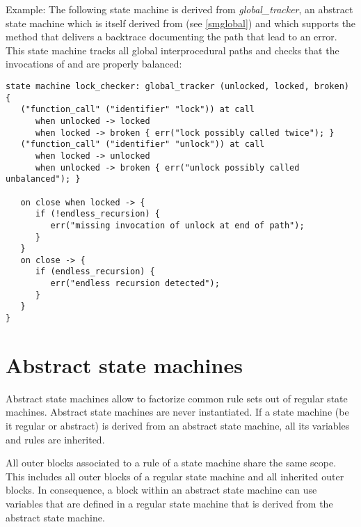 \bigskip
\noindent
Example: The following state machine is derived from \textit{global\_tracker},
an abstract state machine which is itself
derived from  (see \ref{smglobal}) and which supports
the  method that delivers a backtrace documenting the
path that lead to an error. This state machine tracks all global
interprocedural paths and checks that the invocations of 
and  are properly balanced:

\begin{lstlisting}
state machine lock_checker: global_tracker (unlocked, locked, broken) {
   ("function_call" ("identifier" "lock")) at call
      when unlocked -> locked
      when locked -> broken { err("lock possibly called twice"); }
   ("function_call" ("identifier" "unlock")) at call
      when locked -> unlocked
      when unlocked -> broken { err("unlock possibly called unbalanced"); }

   on close when locked -> {
      if (!endless_recursion) {
         err("missing invocation of unlock at end of path");
      }
   }
   on close -> {
      if (endless_recursion) {
         err("endless recursion detected");
      }
   }
}
\end{lstlisting}

\section{Abstract state machines}

Abstract state machines allow to factorize common rule sets out of
regular state machines. Abstract state machines are never instantiated.
If a state machine (be it regular or abstract) is derived from an
abstract state machine, all its variables and rules are inherited.

All outer blocks associated to a rule of a state machine share the same
scope. This includes all outer blocks of a regular state machine and
all inherited outer blocks. In consequence, a block within an
abstract state machine can use variables that are defined in a
regular state machine that is derived from the abstract state machine.

\begin{grammar}
      \produces {} 
	   \nextline
	 \lextoken{\{}  
	 \lextoken{\}} \\
      \produces {} 
	  
	 \lextoken{:}  \nextline
	 \lextoken{\{}  
	 \lextoken{\}}
\end{grammar}

